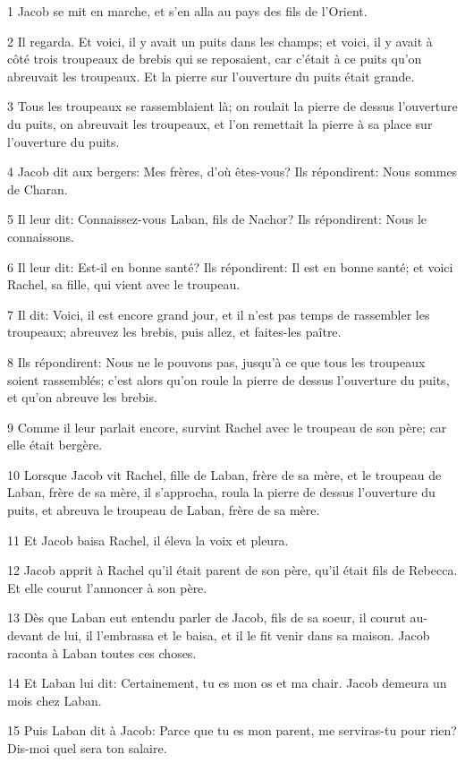 \par 1 Jacob se mit en marche, et s'en alla au pays des fils de l'Orient.
\par 2 Il regarda. Et voici, il y avait un puits dans les champs; et voici, il y avait à côté trois troupeaux de brebis qui se reposaient, car c'était à ce puits qu'on abreuvait les troupeaux. Et la pierre sur l'ouverture du puits était grande.
\par 3 Tous les troupeaux se rassemblaient là; on roulait la pierre de dessus l'ouverture du puits, on abreuvait les troupeaux, et l'on remettait la pierre à sa place sur l'ouverture du puits.
\par 4 Jacob dit aux bergers: Mes frères, d'où êtes-vous? Ils répondirent: Nous sommes de Charan.
\par 5 Il leur dit: Connaissez-vous Laban, fils de Nachor? Ils répondirent: Nous le connaissons.
\par 6 Il leur dit: Est-il en bonne santé? Ils répondirent: Il est en bonne santé; et voici Rachel, sa fille, qui vient avec le troupeau.
\par 7 Il dit: Voici, il est encore grand jour, et il n'est pas temps de rassembler les troupeaux; abreuvez les brebis, puis allez, et faites-les paître.
\par 8 Ils répondirent: Nous ne le pouvons pas, jusqu'à ce que tous les troupeaux soient rassemblés; c'est alors qu'on roule la pierre de dessus l'ouverture du puits, et qu'on abreuve les brebis.
\par 9 Comme il leur parlait encore, survint Rachel avec le troupeau de son père; car elle était bergère.
\par 10 Lorsque Jacob vit Rachel, fille de Laban, frère de sa mère, et le troupeau de Laban, frère de sa mère, il s'approcha, roula la pierre de dessus l'ouverture du puits, et abreuva le troupeau de Laban, frère de sa mère.
\par 11 Et Jacob baisa Rachel, il éleva la voix et pleura.
\par 12 Jacob apprit à Rachel qu'il était parent de son père, qu'il était fils de Rebecca. Et elle courut l'annoncer à son père.
\par 13 Dès que Laban eut entendu parler de Jacob, fils de sa soeur, il courut au-devant de lui, il l'embrassa et le baisa, et il le fit venir dans sa maison. Jacob raconta à Laban toutes ces choses.
\par 14 Et Laban lui dit: Certainement, tu es mon os et ma chair. Jacob demeura un mois chez Laban.
\par 15 Puis Laban dit à Jacob: Parce que tu es mon parent, me serviras-tu pour rien? Dis-moi quel sera ton salaire.
